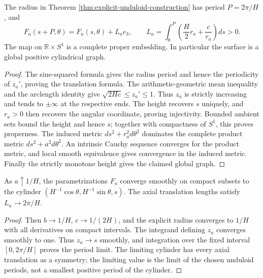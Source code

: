 \begin{proposition}\label{prop:unduloid-global-geometry}
The radius in Theorem \ref{thm:explicit-unduloid-construction} has period $P=2\pi/H$, and
\[
 F_a(s+P,\theta)=F_a(s,\theta)+L_a e_3,\qquad
 L_a=\int_0^P\left(\frac H2r_a+\frac c{r_a}\right)ds>0.
\]
The map on $\mathbb R\times S^1$ is a complete proper embedding. In particular the surface is a global positive cylindrical graph.
\end{proposition}
\begin{proof}
The sine-squared formula gives the radius period and hence the periodicity of $z_a'$, proving the translation formula. The arithmetic-geometric mean inequality and the arclength identity give
$\sqrt{2Hc}\le z_a'\le1$. Thus $z_a$ is strictly increasing and tends to $\pm\infty$ at the respective ends. The height recovers $s$ uniquely, and $r_a>0$ then recovers the angular coordinate, proving injectivity. Bounded ambient sets bound the height and hence $s$; together with compactness of $S^1$, this proves properness. The induced metric $ds^2+r_a^2d\theta^2$ dominates the complete product metric $ds^2+a^2d\theta^2$. An intrinsic Cauchy sequence converges for the product metric, and local smooth equivalence gives convergence in the induced metric. Finally the strictly monotone height gives the claimed global graph.
\end{proof}

\begin{proposition}\label{prop:unduloid-cylinder-limit}
As $a\uparrow1/H$, the parametrizations $F_a$ converge smoothly on compact subsets to the cylinder $(H^{-1}\cos\theta,H^{-1}\sin\theta,s)$. The axial translation lengths satisfy $L_a\to2\pi/H$.
\end{proposition}
\begin{proof}
Then $b\to1/H$, $c\to1/(2H)$, and the explicit radius converges to $1/H$ with all derivatives on compact intervals. The integrand defining $z_a$ converges smoothly to one. Thus $z_a\to s$ smoothly, and integration over the fixed interval $[0,2\pi/H]$ proves the period limit. The limiting cylinder has every axial translation as a symmetry; the limiting value is the limit of the chosen unduloid periods, not a smallest positive period of the cylinder.
\end{proof}

